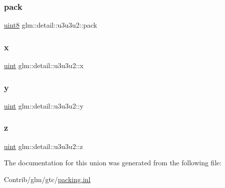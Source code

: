 \mbox{\label{unionglm_1_1detail_1_1u3u3u2_aea48c2c7d1d3283f3c785daa33551351}} 
\subsubsection{\texorpdfstring{pack}{pack}}
{\footnotesize\ttfamily \mbox{\hyperlink{namespaceglm_1_1detail_aef2588f97d090cc19fbbe0c74fe17c8f}{uint8}} glm\+::detail\+::u3u3u2\+::pack}

\mbox{\label{unionglm_1_1detail_1_1u3u3u2_aaa6af1d1bd34a7e72c0d7b1bb622a4da}} 
\subsubsection{\texorpdfstring{x}{x}}
{\footnotesize\ttfamily \mbox{\hyperlink{group__core__precision_ga4fd29415871152bfb5abd588334147c8}{uint}} glm\+::detail\+::u3u3u2\+::x}

\mbox{\label{unionglm_1_1detail_1_1u3u3u2_a2139299d7ae9d48a986ddd3edff8d669}} 
\subsubsection{\texorpdfstring{y}{y}}
{\footnotesize\ttfamily \mbox{\hyperlink{group__core__precision_ga4fd29415871152bfb5abd588334147c8}{uint}} glm\+::detail\+::u3u3u2\+::y}

\mbox{\label{unionglm_1_1detail_1_1u3u3u2_a53e88031a04c880792dd6e36f8e96f9a}} 
\subsubsection{\texorpdfstring{z}{z}}
{\footnotesize\ttfamily \mbox{\hyperlink{group__core__precision_ga4fd29415871152bfb5abd588334147c8}{uint}} glm\+::detail\+::u3u3u2\+::z}



The documentation for this union was generated from the following file\+:\begin{DoxyCompactItemize}
\item 
Contrib/glm/gtc/\mbox{\hyperlink{packing_8inl}{packing.\+inl}}\end{DoxyCompactItemize}
